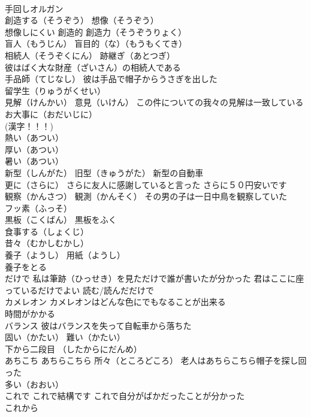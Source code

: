 \documentclass[8pt]{extreport}
\begin{document}
\begin{CJK}{UTF8}{min}
\\	手回しオルガン
\\	創造する（そうぞう） 想像（そうぞう）
\\	想像しにくい 創造的 創造力（そうぞうりょく）
\\	盲人（もうじん） 盲目的（な）（もうもくてき）
\\	相続人（そうぞくにん） 跡継ぎ（あとつぎ）
\\	彼はばく大な財産（ざいさん）の相続人である
\\	手品師（てじなし） 彼は手品で帽子からうさぎを出した
\\	留学生（りゅうがくせい）
\\	見解（けんかい） 意見（いけん） この件についての我々の見解は一致している
\\	お大事に（おだいじに）
\\	(漢字！！！) 
\\	熱い（あつい） 
\\	厚い（あつい） 
\\	暑い（あつい） 
\\	新型（しんがた） 旧型（きゅうがた） 新型の自動車
\\	更に（さらに） さらに友人に感謝していると言った さらに５０円安いです
\\	観察（かんさつ） 観測（かんそく） その男の子は一日中鳥を観察していた
\\	フッ素（ふっそ）
\\	黒板（こくばん） 黒板をふく
\\	食事する（しょくじ）
\\	昔々（むかしむかし）
\\	養子（ようし） 用紙（ようし）
\\	養子をとる
\\	だけで 私は筆跡（ひっせき）を見ただけで誰が書いたが分かった 君はここに座っているだけでよい 読む/読んだだけで
\\	カメレオン カメレオンはどんな色にでもなることが出来る
\\	時間がかかる
\\	バランス 彼はバランスを失って自転車から落ちた
\\	固い（かたい） 難い（かたい）
\\	下から二段目 （したからにだんめ）
\\	あちこち あちらこちら 所々（ところどころ） 老人はあちらこちら帽子を探し回った
\\	多い（おおい）
\\	これで これで結構です これで自分がばかだったことが分かった
\\	これから

\end{CJK}
\end{document}
